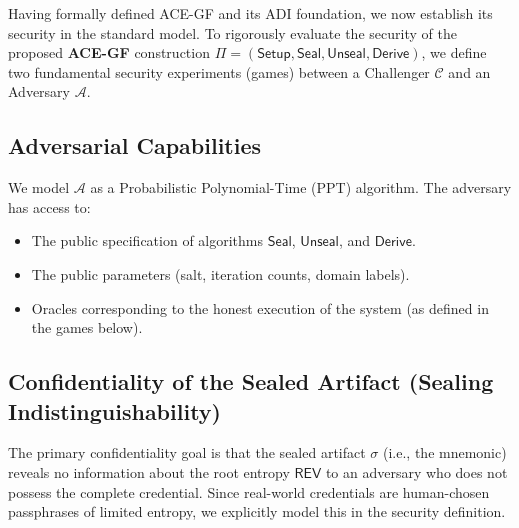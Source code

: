 \documentclass[12pt,a4paper]{article}
\begin{document}
  Having formally defined ACE-GF and its ADI foundation, we now establish its security in the standard model. To rigorously evaluate the security of the proposed \textbf{ACE-GF} construction $\Pi = (\mathsf{Setup}, \mathsf{Seal}, \mathsf{Unseal}, \mathsf{Derive})$, we define two fundamental security experiments (games) between a Challenger $\mathcal{C}$ and an Adversary $\mathcal{A}$.

  \subsection{Adversarial Capabilities}

  We model $\mathcal{A}$ as a Probabilistic Polynomial-Time (PPT) algorithm. The adversary has access to:
  \begin{itemize}
   \item The public specification of algorithms $\mathsf{Seal}$, $\mathsf{Unseal}$, and $\mathsf{Derive}$.
   \item The public parameters (salt, iteration counts, domain labels).
   \item Oracles corresponding to the honest execution of the system (as defined in the games below).
  \end{itemize}

  \subsection{Confidentiality of the Sealed Artifact (Sealing Indistinguishability)}

  The primary confidentiality goal is that the sealed artifact $\sigma$ (i.e., the mnemonic) reveals no information about the root entropy $\mathsf{REV}$ to an adversary who does not possess the complete credential.
  Since real-world credentials are human-chosen passphrases of limited entropy, we explicitly model this in the security definition.
\end{document}
